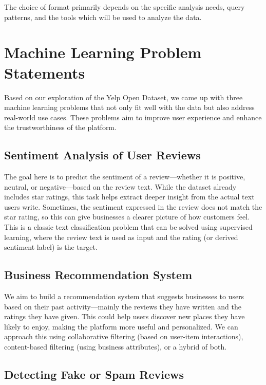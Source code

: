 \documentclass[conference]{IEEEtran}
\begin{document}
The choice of format primarily depends on the specific analysis needs, query patterns,
and the tools which will be used to analyze the data.

\section{Machine Learning Problem Statements}

Based on our exploration of the Yelp Open Dataset, we came up with three machine
learning problems that not only fit well with the data but also address real-world
use cases. These problems aim to improve user experience and enhance the
trustworthiness of the platform.

\subsection{Sentiment Analysis of User Reviews}

The goal here is to predict the sentiment of a review---whether it is positive,
neutral, or negative---based on the review text. While the dataset already includes
star ratings, this task helps extract deeper insight from the actual text users
write. Sometimes, the sentiment expressed in the review does not match the star
rating, so this can give businesses a clearer picture of how customers feel. This
is a classic text classification problem that can be solved using supervised
learning, where the review text is used as input and the rating (or derived
sentiment label) is the target.

\subsection{Business Recommendation System}

We aim to build a recommendation system that suggests businesses to users based
on their past activity---mainly the reviews they have written and the ratings
they have given. This could help users discover new places they have likely to
enjoy, making the platform more useful and personalized. We can approach this
using collaborative filtering (based on user-item interactions), content-based
filtering (using business attributes), or a hybrid of both.

\subsection{Detecting Fake or Spam Reviews}
\end{document}
